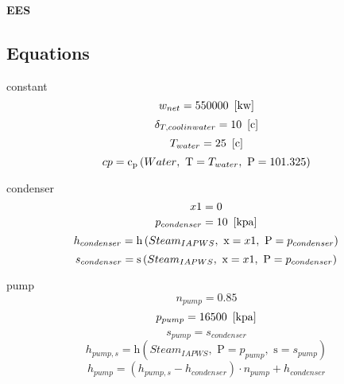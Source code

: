 \documentclass[10pt,fleqn]{article}
\newcommand{\F}[1]{\mbox{$#1$}}
\newcommand{\V}[1]{\mbox{$ #1 $}}
\newcommand{\enthalpy}{\mathrm{h}}
\newcommand{\entropy}{\mathrm{s}}
\newcommand{\cp}{\mathrm{c_p}}
\begin{document}
\begin{center}
\bf \mbox{EES}
\vspace{0.2 in}
\end{center}
\subsection*{Equations}

\vspace{0.04in}
\noindent
{\color{blue} \rm constant}
\begin{equation}
\label{EES Eqn:1}
w_{net}=550000   \   \left[ \rm kw \right] 
\end{equation}
{\color{blue} \rm}
\begin{equation}
\label{EES Eqn:2}
{\delta }_{T,coolinwater}=10   \   \left[ \rm c \right] 
\end{equation}
{\color{blue} \rm}
\begin{equation}
\label{EES Eqn:3}
T_{water}=25   \   \left[ \rm c \right] 
\end{equation}
{\color{blue} \rm}
\begin{equation}
\label{EES Eqn:4}
\V{cp} =\cp \left(\F{Water},\mbox{\ T}=T_{water},\mbox{\ P}=101.325 \right)  
\end{equation}

\vspace{0.04in}
\noindent
{\color{blue} \rm condenser}
\begin{equation}
\label{EES Eqn:5}
\V{x1} =0 
\end{equation}
\begin{equation}
\label{EES Eqn:6}
p_{condenser}=10   \   \left[ \rm kpa \right] 
\end{equation}
{\color{blue} \rm}
\begin{equation}
\label{EES Eqn:7}
h_{condenser}=\enthalpy \left(\F{Steam}_{IAPWS},\mbox{\ x}=\V{x1} ,\mbox{\ P}=p_{condenser} \right)  
\end{equation}
\begin{equation}
\label{EES Eqn:8}
s_{condenser}=\entropy \left(\F{Steam}_{IAPWS},\mbox{\ x}=\V{x1} ,\mbox{\ P}=p_{condenser} \right)  
\end{equation}

\vspace{0.04in}
\noindent
{\color{blue} \rm pump}
\begin{equation}
\label{EES Eqn:9}
n_{pump}=0.85 
\end{equation}
\begin{equation}
\label{EES Eqn:10}
p_{pump} = 16500   \   \left[ \rm kpa \right] 
\end{equation}
{\color{blue} \rm}
\begin{equation}
\label{EES Eqn:11}
s_{pump}=s_{condenser} 
\end{equation}
\begin{equation}
\label{EES Eqn:12}
h_{pump,s}=\enthalpy \left(\F{Steam}_{IAPWS},\mbox{\ P}=p_{pump},\mbox{\ s}=s_{pump} \right)  
\end{equation}
\begin{equation}
\label{EES Eqn:13}
h_{pump}= \left( h_{pump,s}- h_{condenser} \right) \cdot n_{pump}+h_{condenser} 
\end{equation}
\end{document}
